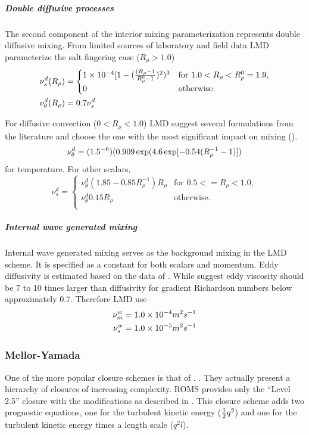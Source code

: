 \subparagraph{Double diffusive processes}
The second component of the interior mixing parameterization represents
double diffusive mixing.  From limited sources of laboratory and field
data LMD parameterize the salt fingering case ($R_{\rho}>1.0$)
\begin{align}
\nu_{s}^{d}(R_{\rho}) & =
	\begin{cases}
      1\times10^{-4}[1-(\frac{(R_{\rho}-1}{R_{\rho}^0-1})^2)^{3}&
      \text{for $1.0<R_{\rho}<R_{\rho}^0=1.9$},\\
           0& \text{otherwise}.
        \end{cases}
\\ \vspace{1mm}
\nu_{\theta}^{d}(R_{\rho}) & =0.7\nu_{s}^{d}
\end{align}

For diffusive convection ($0<R_{\rho}<1.0$) LMD suggest several
formulations from the literature and choose the one with the most
significant impact on mixing (\cite{Fedorov88}).
\begin{equation}
\nu_{\theta}^{d}=(1.5 \time 10^{-6})(0.909 \exp(4.6 \exp[-0.54(R_{\rho}^{-1}-1)])
\end{equation}
for temperature.  For other scalars,
\begin{equation}
   \nu_{s}^{d}=
	\begin{cases}
	     \nu_{\theta}^{d}(1.85-0.85R_{\rho}^{-1})R_{\rho}& \text{for $0.5<=R_{\rho}<1.0$},\\ 
             \nu_{\theta}^{d}0.15R_{\rho}&  \text{otherwise}. \\
        \end{cases}
\end{equation}

\subparagraph{Internal wave generated mixing}
Internal wave generated mixing serves as the background mixing in the
LMD scheme.  It is specified as a constant for both scalars and
momentum.  Eddy diffusivity is estimated based on the data of
\cite{LWL93}.  While \cite{Peters88} suggest
eddy viscosity should be 7 to 10 times larger than diffusivity for
gradient Richardson numbers below approximately 0.7.  Therefore LMD use
\begin{align}
\nu_{m}^w & =1.0 \times 10^{-4} m^2 s^{-1}
\\ \vspace{1mm}
\nu_{s}^w & =1.0 \times 10^{-5} m^2 s^{-1}
\end{align}

\subsubsection{Mellor-Yamada}
\label{sec:MY25}
One of the more popular closure schemes is that of
\cite{Mellor74}, \cite{Mellor82}. They actually present a hierarchy of
closures of increasing complexity. ROMS provides only the
``Level 2.5'' closure with the \cite{Galperin88}
modifications as described in \cite{Allen95}.
This closure scheme adds two prognostic equations, one
for the turbulent kinetic energy (${1 \over 2} q^2$) and one for the
turbulent kinetic energy times a length scale ($q^2l$).

